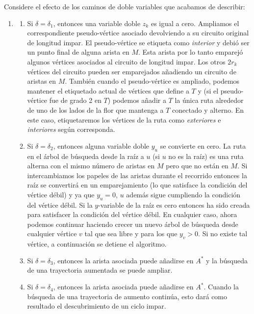 \documentclass[10pt,a5paper]{book}
\begin{document}
Considere el efecto de los caminos de doble variables que acabamos de describir:
\begin{enumerate}
\item []
\begin{enumerate}
\item Si $\delta = \delta_1$, entonces una variable doble $z_k$ es igual a cero. Ampliamos el correspondiente pseudo-vértice asociado devolviendo a su circuito original de longitud impar. El pseudo-vértice se etiqueta como \emph{interior} y debió ser un punto final de alguna arista en $M$. Esta arista por lo tanto emparejó algunos vértices asociados al circuito de longitud impar. Los otros $2r_k$ vértices del circuito pueden ser emparejados añadiendo un circuito de aristas en $M$. También cuando el pseudo-vértice es ampliado, podemos mantener el etiquetado actual de vértices que define a $T$ y (si el pseudo-vértice fue de grado 2 en $T$) podemos añadir a $T$ la única ruta alrededor de uno de los lados de la flor que mantenga a $T$ conectado y alterno. En este caso, etiquetaremos los vértices de la ruta como \emph{exteriores} e \emph{interiores} según corresponda.
\item Si $\delta = \delta_2$, entonces alguna variable doble $y_u$ se convierte en cero. La ruta en el árbol de búsqueda desde la raíz a $u$ (si $u$ no es la raíz) es una ruta alterna con el mismo número de aristas en $M$ pero que no están en $M$. Si intercambiamos los papeles de las aristas durante el recorrido entonces la raíz se convertirá en un emparejamiento (lo que satisface la condición del vértice débil) y ya que $y_u = 0$, $u$ además sigue cumpliendo la condición del vértice débil. Si la $y$-variable de la raíz es cero entonces ha sido creada para satisfacer la condición del vértice débil. En cualquier caso, ahora podemos continuar haciendo crecer un nuevo árbol de búsqueda desde cualquier vértice $v$ tal que sea libre y para los que $y_v > 0$. Si no existe tal vértice, a continuación se detiene el algoritmo.
\item Si $\delta = \delta_3$, entonces la arista asociada puede añadirse en $A^*$ y la búsqueda de una trayectoria aumentada se puede ampliar.
\item Si $\delta = \delta_4$, entonces la arista asociada puede añadirse en $A^*$. Cuando la búsqueda de una trayectoria de aumento continúa, esto dará como resultado el descubrimiento de un ciclo impar.
\end{enumerate}
\end{enumerate}
\end{document}
